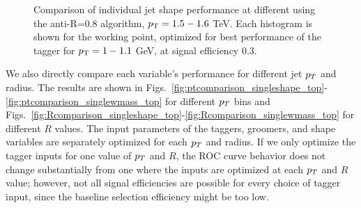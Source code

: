 \begin{figure}
\begin{center}
\caption{Comparison of individual jet shape performance at different \pt using the anti-\kT R=0.8 algorithm, $p_{\rm T}=1.5-1.6$ TeV. Each histogram is shown for the working point, optimized for best performance of the tagger for $p_{\rm T}=1-1.1$ GeV, at signal efficiency 0.3.}
\label{fig:topmass_histogram_optallonce_HEP_JH}
\end{center}
\end{figure}



We also directly compare each variable's performance for different jet $p_T$ and radius. The results are shown in Figs.~\ref{fig:ptcomparison_singleshape_top}-\ref{fig:ptcomparison_singlewmass_top} for different $p_T$ bins and Figs.~\ref{fig:Rcomparison_singleshape_top}-\ref{fig:Rcomparison_singlewmass_top} for different $R$ values. The input parameters of the taggers, groomers, and shape variables are separately optimized for each $p_T$ and radius. If we only optimize the tagger inputs for one value of $p_T$ and $R$, the ROC curve behavior does not change substantially from one where the inputs are optimized at each $p_T$ and $R$ value; however, not all signal efficiencies are possible for every choice of tagger input, since the baseline selection efficiency might be too low. 


